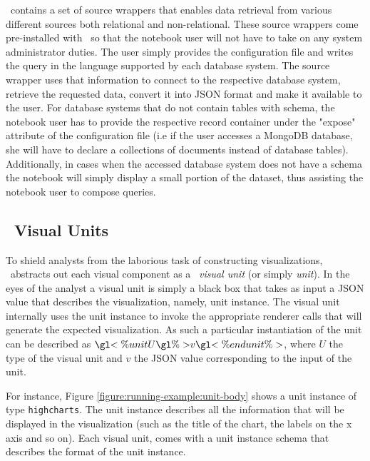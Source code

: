 \projname\ contains a set of source wrappers that enables data retrieval from various different sources both relational and non-relational. These source wrappers come pre-installed with \projname\ so that the notebook user will not have to take on any system administrator duties. The user simply provides the configuration file and writes the query in the language supported by each database system. The source wrapper uses that information to connect to the respective database system, retrieve the requested data, convert it into JSON format and make it available to the user. For database systems that do not contain tables with schema, the notebook user has to provide the respective record container under the "expose" attribute of the configuration file (i.e if the user accesses a MongoDB database, she will have to declare a collections of documents instead of database tables). Additionally, in cases when the accessed database system does not have a schema the notebook will simply display a small portion of the dataset, thus assisting the notebook user to compose queries.



\subsection{\projname\ Visual Units}
\label{section:visual Units}

\noindent To shield analysts from the laborious task of constructing visualizations, \projname\ abstracts out each visual component as a \projname\ \emph{visual unit} (or simply \emph{unit}). In the eyes of the analyst a visual unit is simply a black box that takes as input a JSON value that describes the visualization, namely, unit instance. The visual unit internally uses the unit instance to invoke the appropriate renderer calls that will generate the expected visualization. As such a particular instantiation of the unit  can be described as $\gl{<\% unit } U \gl{ \%> } v \gl{ <\% end unit \%>}$, where $U$ the type of the visual unit and $v$ the JSON value corresponding to the input of the unit. 


For instance, Figure \ref{figure:running-example:unit-body} shows a unit instance of type \texttt{highcharts}. The unit instance describes all the information that will be displayed in the visualization (such as the title of the chart, the labels on the x axis and so on). Each visual unit, comes with a unit instance schema that describes the format of the unit instance.


